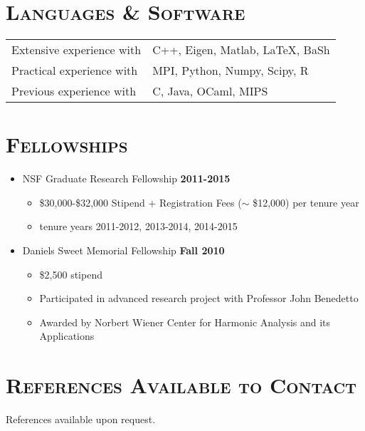 \documentclass[margin, 10pt]{res} %
\begin{document}
\begin{resume}

\section{\textsc{Languages \& Software} }
\begin{tabular}{ll}
Extensive experience with\phantom{this text will push} & C++, Eigen, Matlab, LaTeX, BaSh \\
Practical experience with & MPI, Python, Numpy, Scipy, R \\
Previous experience with & C, Java, OCaml, MIPS  \\
\end{tabular}

 
\section{\textsc{Fellowships}}
\begin{itemize}
\item NSF Graduate Research Fellowship \hfill \textbf{2011-2015}
\begin{itemize}
\item \$30,000-\$32,000 Stipend + Registration Fees ($\sim$ \$12,000) per tenure year
\item tenure years 2011-2012, 2013-2014, 2014-2015
\end{itemize}
\item Daniels Sweet Memorial Fellowship \hfill \textbf{ Fall 2010}
\begin{itemize}
\item \$2,500 stipend
\item Participated in advanced research project with Professor John Benedetto
\item Awarded by Norbert Wiener Center for Harmonic Analysis and its Applications
\end{itemize}
\end{itemize}


\section{\textsc{References Available to Contact}}
References available upon request.




\end{resume}
\end{document}
